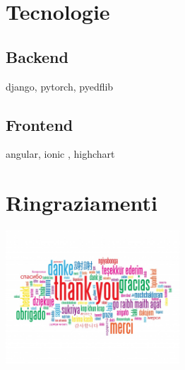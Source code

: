 \documentclass[xcolor=x11names,compress, 
					handout %
]{beamer}
\theoremstyle{definition} \newtheorem{esempio}{Esempio}
\theoremstyle{definition}
\begin{document}
\section{Tecnologie}
	\subsection{Backend}
		\begin{frame}{\subsecname}
			django, pytorch, pyedflib
		\end{frame}

	\subsection{Frontend}
		\begin{frame}{\subsecname}
			angular, ionic , highchart
		\end{frame}

\section*{Ringraziamenti}
	\begin{frame}
		\begin{center}
			\includegraphics[width=6.5cm]{./immagini/thanks}
		\end{center}
	\end{frame}
\end{document}
